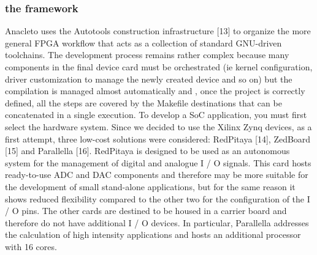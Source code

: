 \subsubsection{the framework}
Anacleto uses the Autotools construction infrastructure [13] to organize the more general FPGA workflow that acts as a collection of standard GNU-driven toolchains. The development process remains rather complex because many components in the final device card must be orchestrated (ie kernel configuration, driver customization to manage the newly created device and so on) but the compilation is managed almost automatically and , once the project is correctly defined, all the steps are covered by the Makefile destinations that can be concatenated in a single execution. To develop a SoC application, you must first select the hardware system. Since we decided to use the Xilinx Zynq devices, as a first attempt, three low-cost solutions were considered: RedPitaya [14], ZedBoard [15] and Parallella [16]. RedPitaya is designed to be used as an autonomous system for the management of digital and analogue I / O signals. This card hosts ready-to-use ADC and DAC components and therefore may be more suitable for the development of small stand-alone applications, but for the same reason it shows reduced flexibility compared to the other two for the configuration of the I / O pins. The other cards are destined to be housed in a carrier board and therefore do not have additional I / O devices. In particular, Parallella addresses the calculation of high intensity applications and hosts an additional processor with 16 cores.

